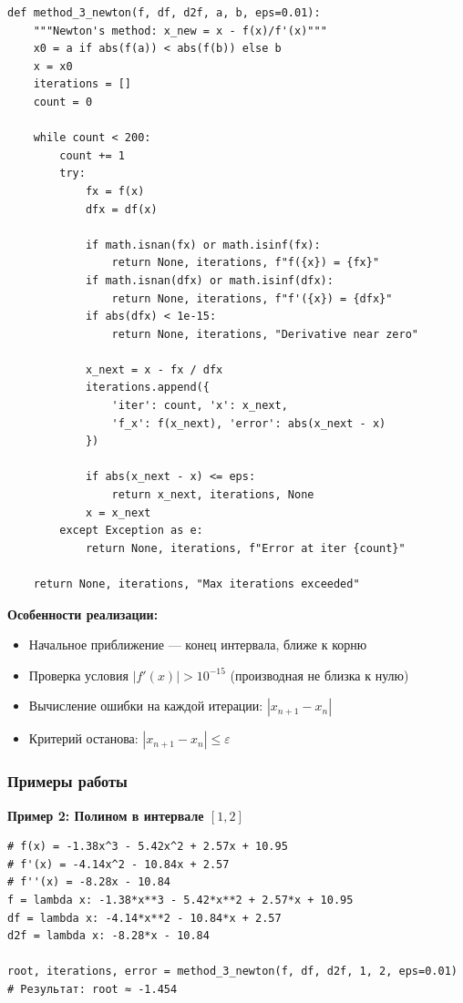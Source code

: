 \documentclass[a4paper,12pt]{article}
\begin{document}
\begin{lstlisting}[style=intellij,caption={method\_3\_newton()},basicstyle=\ttfamily\small\color{intj-id}]
def method_3_newton(f, df, d2f, a, b, eps=0.01):
    """Newton's method: x_new = x - f(x)/f'(x)"""
    x0 = a if abs(f(a)) < abs(f(b)) else b
    x = x0
    iterations = []
    count = 0
    
    while count < 200:
        count += 1
        try:
            fx = f(x)
            dfx = df(x)
            
            if math.isnan(fx) or math.isinf(fx):
                return None, iterations, f"f({x}) = {fx}"
            if math.isnan(dfx) or math.isinf(dfx):
                return None, iterations, f"f'({x}) = {dfx}"
            if abs(dfx) < 1e-15:
                return None, iterations, "Derivative near zero"
            
            x_next = x - fx / dfx
            iterations.append({
                'iter': count, 'x': x_next,
                'f_x': f(x_next), 'error': abs(x_next - x)
            })
            
            if abs(x_next - x) <= eps:
                return x_next, iterations, None
            x = x_next
        except Exception as e:
            return None, iterations, f"Error at iter {count}"
    
    return None, iterations, "Max iterations exceeded"
\end{lstlisting}

\textbf{Особенности реализации:}
\begin{itemize}
    \item Начальное приближение --- конец интервала, ближе к корню
    \item Проверка условия $|f'(x)| > 10^{-15}$ (производная не близка к нулю)
    \item Вычисление ошибки на каждой итерации: $|x_{n+1} - x_n|$
    \item Критерий останова: $|x_{n+1} - x_n| \leq \varepsilon$
\end{itemize}

\subsubsection*{Примеры работы}

\textbf{Пример 2: Полином в интервале $[1, 2]$}

\begin{lstlisting}[style=intellij,basicstyle=\ttfamily\small\color{intj-id}]
# f(x) = -1.38x^3 - 5.42x^2 + 2.57x + 10.95
# f'(x) = -4.14x^2 - 10.84x + 2.57
# f''(x) = -8.28x - 10.84
f = lambda x: -1.38*x**3 - 5.42*x**2 + 2.57*x + 10.95
df = lambda x: -4.14*x**2 - 10.84*x + 2.57
d2f = lambda x: -8.28*x - 10.84

root, iterations, error = method_3_newton(f, df, d2f, 1, 2, eps=0.01)
# Результат: root ≈ -1.454
\end{lstlisting}
\end{document}
